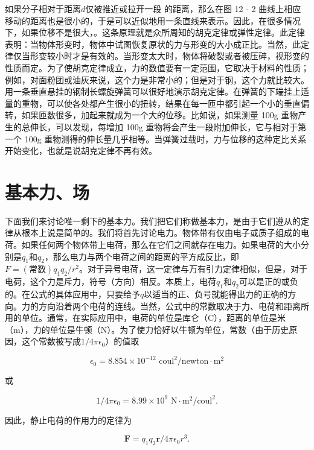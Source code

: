 \documentclass[12pt,oneside]{book}
\providecommand{\FLPvec}[1]{\boldsymbol{#1}}
\providecommand{\FLPF}[0]{\FLPvec{F}}
\providecommand{\FLPr}[0]{\FLPvec{r}}
\begin{document}
如果分子相对于距离$d$仅被推近或拉开一段  的距离，那么在图 12 - 2 曲线上相应移动的距离也是很小的，于是可以近似地用一条直线来表示。因此，在很多情况下，如果位移不是很大，。这条原理就是众所周知的胡克定律或弹性定律。此定律表明：当物体形变时，物体中试图恢复原状的力与形变的大小成正比。当然，此定律仅当形变较小时才是有效的。当形变太大时，物体将破裂或者被压碎，视形变的性质而定。为了使胡克定律成立，力的数值要有一定范围，它取决于材料的性质；例如，对面粉团或油灰来说，这个力是非常小的；但是对于钢，这个力就比较大。用一条垂直悬挂的钢制长螺旋弹簧可以很好地演示胡克定律。在弹簧的下端挂上适量的重物，可以使各处都产生很小的扭转，结果在每一匝中都引起一个小的垂直偏转，如果匝数很多，加起来就成为一个大的位移。比如说，如果测量 100g 重物产生的总伸长，可以发现，每增加 100g 重物将会产生一段附加伸长，它与相对于第一个 100g 重物测得的伸长量几乎相等。当弹簧过载时，力与位移的这种定比关系开始变化，也就是说胡克定律不再有效。


\section{基本力、场}
下面我们来讨论唯一剩下的基本力。我们把它们称做基本力，是由于它们遵从的定律从根本上说是简单的。我们将首先讨论电力。物体带有仅由电子或质子组成的电荷。如果任何两个物体带上电荷，那么在它们之间就存在电力。如果电荷的大小分别是$q_1$和$q_2$，那么电力与两个电荷之间的距离的平方成反比，即$F=(\text{常数}) q_1q_2/r^2$。对于异号电荷，这一定律与万有引力定律相似，但是，对于  电荷，这个力是斥力，符号（方向）相反。本质上，电荷$q_1$和$q_2$可以是正的或负的。在公式的具体应用中，只要给予$q$以适当的正、负号就能得出力的正确的方向。力的方向沿着两个电荷的连线。当然，公式中的常数取决于力、电荷和距离所用的单位。通常，在实际应用中，电荷的单位是库仑（C），距离的单位是米（m），力的单位是牛顿（N）。为了使力恰好以牛顿为单位，常数（由于历史原因，这个常数被写成$1/4\pi\epsilon_0$）的值取


\begin{equation*}
\epsilon_0=8.854\times10^{-12}\text{ coul}^2/\text{newton}\cdot\text{m}^2
\end{equation*}

或

\begin{equation*}
1/4\pi\epsilon_0=8.99\times10^9\text{ N}\cdot\text{m}^2/\text{coul}^2.
\end{equation*}

因此，静止电荷的作用力的定律为


\begin{equation}
\label{Eq:I:12:2}
\FLPF=q_1q_2\FLPr/4\pi\epsilon_0 r^3.
\end{equation}
\end{document}
